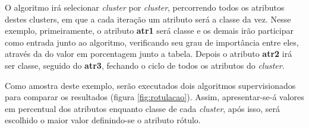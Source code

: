 O algoritmo irá selecionar \textit{cluster} por \textit{cluster}, percorrendo todos os atributos destes clusters, em que a cada iteração um atributo será a classe da vez. Nesse exemplo, primeiramente, o atributo \textbf{atr1} será classe e os demais irão participar como entrada junto ao algoritmo, verificando seu grau de importância entre eles, através da do valor em porcentagem junto a tabela. Depois o atributo \textbf{atr2} irá ser classe, seguido do \textbf{atr3}, fechando o ciclo de todos os atributos do \textit{cluster}.

Como amostra deste exemplo, serão executados dois algoritmos supervisionados para comparar os resultados (figura \ref{fig:rotulacao}). Assim, apresentar-se-á valores em percentual dos atributos enquanto classe de cada \textit{cluster}, após isso, será escolhido o maior valor definindo-se o atributo rótulo.



